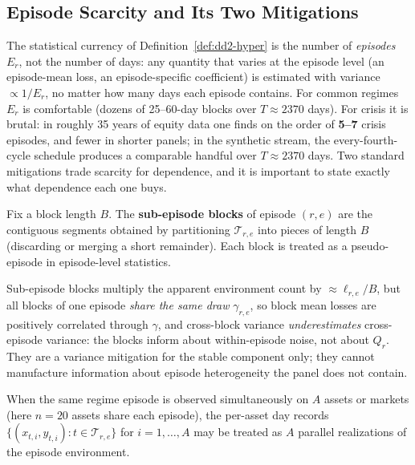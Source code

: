 \subsection{Episode Scarcity and Its Two Mitigations}
\label{sec:dd2-scarcity}

The statistical currency of Definition~\ref{def:dd2-hyper} is the number of
\emph{episodes} $E_r$, not the number of days: any quantity that varies at the
episode level (an episode-mean loss, an episode-specific coefficient) is
estimated with variance $\propto 1/E_r$, no matter how many days each episode
contains. For common regimes $E_r$ is comfortable (dozens of 25--60-day
blocks over $T \approx 2370$ days). For \textsf{crisis} it is brutal: in
roughly 35 years of equity data one finds on the order of \textbf{5--7}
crisis episodes, and fewer in shorter panels; in the synthetic stream, the
every-fourth-cycle schedule produces a comparable handful over
$T \approx 2370$ days. Two standard mitigations trade scarcity for
dependence, and it is important to state exactly what dependence each one
buys.

\begin{definition}
\label{def:dd2-subepisode}
Fix a block length $B$. The \textbf{sub-episode blocks} of episode $(r,e)$
are the contiguous segments obtained by partitioning $\mathcal{T}_{r,e}$ into
pieces of length $B$ (discarding or merging a short remainder). Each block is
treated as a pseudo-episode in episode-level statistics.
\end{definition}

Sub-episode blocks multiply the apparent environment count by
$\approx \ell_{r,e}/B$, but all blocks of one episode \emph{share the same
draw} $\gamma_{r,e}$, so block mean losses are positively correlated through
$\gamma$, and cross-block variance \emph{underestimates} cross-episode
variance: the blocks inform about within-episode noise, not about $Q_r$.
They are a variance mitigation for the stable component only; they cannot
manufacture information about episode heterogeneity the panel does not
contain.

\begin{definition}
\label{def:dd2-crossasset}
When the same regime episode is observed simultaneously on $A$ assets or
markets (here $n = 20$ assets share each episode), the per-asset day records
$\{(x_{t,i}, y_{t,i}) : t \in \mathcal{T}_{r,e}\}$ for $i = 1, \ldots, A$ may
be treated as $A$ parallel realizations of the episode environment.
\end{definition}

